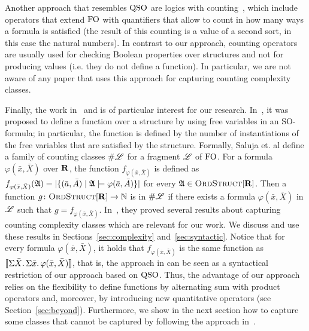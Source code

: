 Another approach that resembles ${\rm QSO}$ are logics with counting~\cite{IL90,E97,GG98,L04}, which include operators that extend ${\rm FO}$ with quantifiers that allow to count in how many ways a formula  is satisfied (the result of this counting is a value of a second sort, in this case the  natural numbers). 
In contrast to our approach, counting operators are usually used for checking Boolean properties over structures and not for producing values (i.e. they do not define a function).
In particular, we are not aware of any paper that uses this approach for capturing counting complexity classes.

Finally, the work in~\cite{SalujaST95} and \cite{ComptonG96} is of particular interest for our research. 
In~\cite{SalujaST95}, it was proposed to define a function over a structure by using free variables in an SO-formula; in particular, the function is defined by the number of instantiations of the free variables that are satisfied by the structure.
Formally, Saluja et. al \cite{SalujaST95} define a family of counting classes $\#\mathscr{L}$ for a fragment $\mathscr{L}$ of ${\rm FO}$. For a formula $\varphi(\bar{x},\bar{X})$ over $\mathbf{R}$, the function $f_{\varphi(\bar x, \bar X)}$ is defined as
$
f_{\varphi(\bar x, \bar X)}(\mathfrak{A}) = \vert \{(\bar{a},\bar{A}) \mid \mathfrak{A}\models\varphi(\bar{a},\bar{A})\}\vert
$
for every $\mathfrak{A}\in\text{\sc OrdStruct}[\mathbf{R}]$. Then a function $g\colon \text{\sc OrdStruct}[\mathbf{R}]\to\mathbb{N}$ is in $\#\mathscr{L}$ if there exists a formula $\varphi(\bar{x},\bar{X})$ in $\mathscr{L}$ such that $g = f_{\varphi(\bar x, \bar X)}$.
In~\cite{SalujaST95}, they proved several results about capturing counting complexity classes which are relevant for our work. We discuss and use these results in Sections~\ref{sec:complexity} and~\ref{sec:syntactic}.
Notice that for every formula $\varphi(\bar{x},\bar{X})$, it holds that $f_{\varphi(\bar{x},\bar{X})}$ is the same function as ${\llbracket{}{\Sigma{\bar{X}}.\, \Sigma{\bar{x}}.\, \varphi(\bar{x},\bar{X})}\rrbracket}$, that is, the approach in \cite{SalujaST95} can be seen as a syntactical restriction of our approach based on ${\rm QSO}$. 
Thus, the advantage of our approach relies on the flexibility to define functions by alternating sum with product operators and, moreover, by introducing new quantitative operators (see Section~\ref{sec:beyond}).
Furthermore, we show in the next section how to capture some classes that cannot be captured by following the approach in~\cite{SalujaST95}.
